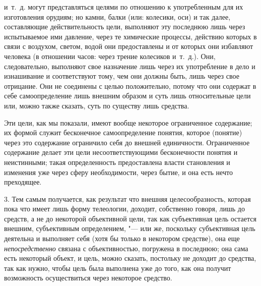 и~т.~д. могут представляться целями по отношению к употребленным для их
изготовления орудиям; но камни, балки (или: колесики, оси) и так далее,
составляющие действительность цели, выполняют эту последнюю лишь через
испытываемое ими давление, через те химические процессы, действию которых в
связи с воздухом, светом, водой они предоставлены и от которых они
избавляют человека (в отношении часов: через трение колесиков и~т.~д.).
Они, следовательно, выполняют свое назначение лишь через их употребление в
дело и изнашивание и соответствуют тому, чем они должны быть, лишь через
свое отрицание. Они не соединены с целью положительно, потому что они
содержат в себе самоопределение лишь внешним образом и суть лишь
относительные цели или, можно также сказать, суть по существу лишь
средства.

Эти цели, как мы показали, имеют вообще некоторое ограниченное
содержание; их формой служит бесконечное самоопределение понятия, которое
(понятие) через это содержание ограничило себя до внешней единичности.
Ограниченное содержание делает эти цели несоответствующими бесконечности
понятия и неистинными; такая определенность предоставлена власти
становления и изменения уже через сферу необходимости, через бытие, и она
есть нечто преходящее.

3. Тем самым получается, как результат что внешняя
целесообразность, которая пока что имеет лишь форму телеологии, доходит,
собственно говоря, лишь до средств, а не до некоторой объективной цели, так
как субъективная цель остается внешним, субъективным определением, "---
или же, поскольку субъективная цель деятельна и выполняет
себя (хотя бы только в некотором средстве), она еще
{\em непосредственно}
связана с объективностью, погружена в последнюю; она сама
есть некоторый объект, и цель, можно сказать, постольку не доходит до
средства, так как нужно, чтобы цель была выполнена уже до того, как она
получит возможность осуществиться через некоторое средство.

